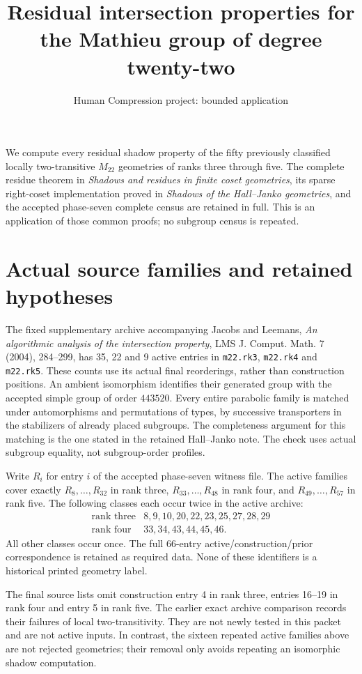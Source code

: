 \documentclass[11pt,a4paper]{article}
\title{Residual intersection properties for the Mathieu group of degree twenty-two}
\author{Human Compression project: bounded application}\date{}
\begin{document}
\maketitle
We compute every residual shadow property of the fifty previously classified
locally two-transitive $M_{22}$ geometries of ranks three through five.
The complete residue theorem in \emph{Shadows and residues in finite coset
geometries}, its sparse right-coset implementation proved in \emph{Shadows
of the Hall--Janko geometries}, and the accepted phase-seven complete
census are retained in full. This is an application of those common proofs;
no subgroup census is repeated.

\section{Actual source families and retained hypotheses}
The fixed supplementary archive accompanying Jacobs and Leemans,
\emph{An algorithmic analysis of the intersection property}, LMS
J. Comput. Math. 7 (2004), 284--299, has 35, 22 and 9 active entries in
\texttt{m22.rk3}, \texttt{m22.rk4} and \texttt{m22.rk5}. These counts use
its actual final reorderings, rather than construction positions. An
ambient isomorphism identifies their generated group with the accepted
simple group of order $443520$. Every entire parabolic family is matched
under automorphisms and permutations of types, by successive transporters
in the stabilizers of already placed subgroups. The completeness argument
for this matching is the one stated in the retained Hall--Janko note.
The check uses actual subgroup equality, not subgroup-order profiles.

Write $R_i$ for entry $i$ of the accepted phase-seven witness file. The
active families cover exactly $R_8,\ldots,R_{32}$ in rank three,
$R_{33},\ldots,R_{48}$ in rank four, and $R_{49},\ldots,R_{57}$ in rank five.
The following classes each occur twice in the active archive:
\[
\begin{array}{c|l}
\text{rank three}&8,9,10,20,22,23,25,27,28,29\\
\text{rank four}&33,34,43,44,45,46.
\end{array}
\]
All other classes occur once. The full 66-entry active/construction/prior
correspondence is retained as required data. None of these identifiers is
a historical printed geometry label.

The final source lists omit construction entry 4 in rank three, entries
16--19 in rank four and entry 5 in rank five. The earlier exact archive
comparison records their failures of local two-transitivity. They are not
newly tested in this packet and are not active inputs. In contrast, the
sixteen repeated active families above are not rejected geometries; their
removal only avoids repeating an isomorphic shadow computation.
\end{document}
